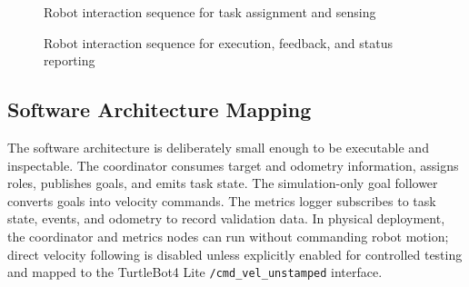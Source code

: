 \documentclass{ieeeaccess}
\begin{document}
\begin{figure}[htbp]
  \centering
  
  \caption{Robot interaction sequence for task assignment and sensing}
  \label{fig_diag_sque_1}
\end{figure}

\begin{figure}[htbp]
  \centering
  
  \caption{Robot interaction sequence for execution, feedback, and status reporting}
  \label{fig_diag_sque_2}
\end{figure}

\subsection{Software Architecture Mapping}
The software architecture is deliberately small enough to be executable and inspectable. The coordinator consumes target and odometry information, assigns roles, publishes goals, and emits task state. The simulation-only goal follower converts goals into velocity commands. The metrics logger subscribes to task state, events, and odometry to record validation data. In physical deployment, the coordinator and metrics nodes can run without commanding robot motion; direct velocity following is disabled unless explicitly enabled for controlled testing and mapped to the TurtleBot4 Lite \texttt{/cmd\_vel\_unstamped} interface.
\end{document}
